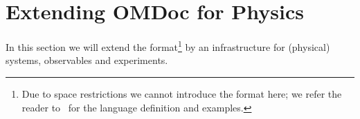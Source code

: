 \def\llquote#1{\ensuremath{\langle\kern-.25em\langle{#1}\rangle\kern-.25em\rangle}}
\def\PHYSmodule#1{\module{PHYS}{#1}{Foundations of Physics}} 
\def\mobjabbr{OMOBJ |m:math |legacy}
\def\module#1#2#3{#1}
\def\indextoo#1{#1}
\def\snippet#1{\tt{#1}}
\def\Kelvin{K}
\def\Celsius{{}^{\circ}C}

\section{Extending OMDoc for Physics}\label{HandleOnKnowledge}

In this section we will extend the {\omdoc} format\footnote{Due to space restrictions we
  cannot introduce the format here; we refer the reader to~\cite{Kohlhase:omdoc1.2} for
  the language definition and examples.} by an infrastructure for (physical) systems,
observables and experiments.
